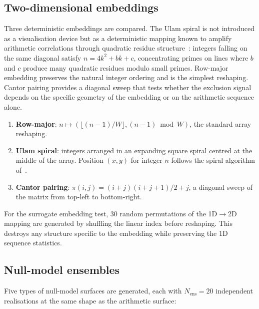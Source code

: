 \documentclass[final,3p,times,twocolumn]{elsarticle}
\theoremstyle{definition}
\begin{document}
\subsection{Two-dimensional embeddings}

Three deterministic embeddings are compared. The Ulam spiral is
not introduced as a visualisation device but as a deterministic
mapping known to amplify arithmetic correlations through quadratic
residue structure~\cite{ULAM-SPIRAL-1963}: integers falling on the
same diagonal satisfy $n = 4k^2 + bk + c$, concentrating primes on
lines where $b$ and $c$ produce many quadratic residues modulo small
primes. Row-major embedding preserves the natural integer ordering
and is the simplest reshaping. Cantor pairing provides a diagonal
sweep that tests whether the exclusion signal depends on the
specific geometry of the embedding or on the arithmetic sequence
alone.
\begin{enumerate}
  \item \textbf{Row-major}: $n \mapsto (\lfloor (n-1)/W \rfloor,
        (n-1) \bmod W)$, the standard array reshaping.
  \item \textbf{Ulam spiral}: integers arranged in an expanding square
        spiral centred at the middle of the array. Position $(x,y)$ for
        integer $n$ follows the spiral algorithm of~\cite{ULAM-SPIRAL-1963}.
  \item \textbf{Cantor pairing}:
        $\pi(i,j) = (i+j)(i+j+1)/2 + j$, a diagonal sweep of the
        matrix from top-left to bottom-right.
\end{enumerate}

For the surrogate embedding test, 30 random permutations of the
1D$\to$2D mapping are generated by shuffling the linear index before
reshaping. This destroys any structure specific to the embedding while
preserving the 1D sequence statistics.

\subsection{Null-model ensembles}

Five types of null-model surfaces are generated, each with
$N_{\text{ens}} = 20$ independent realisations at the same shape as
the arithmetic surface:
\end{document}
